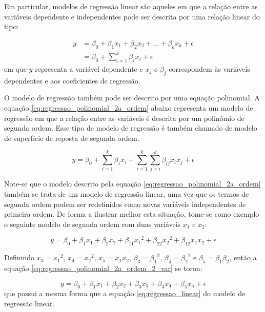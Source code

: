 \documentclass[brazil,tf,epusp]{usp}  %
\begin{document}
Em particular, modelos de regressão linear são aqueles em que a relação entre as variáveis dependente e independentes pode ser descrita por uma relação linear do tipo:

\begin{align}
  y &= \beta_0 + \beta_1 x_1 + \beta_2 x_2 + \dots + \beta_k x_k + \epsilon \nonumber \\
    &= \beta_0 + \sum_{i=1}^k \beta_i x_i + \epsilon
  \label{eq:regressao_linear}
\end{align}
%
em que $y$ representa a variável dependente e $x_j$ e $\beta_j$ correspondem às variáveis dependentes e aos coeficientes de regressão.

O modelo de regressão também pode ser descrito por uma equação polinomial. A equação \ref{eq:regressao_polinomial_2a_ordem} abaixo representa um modelo de regressão em que a relação entre as variáveis é descrita por um polinômio de segunda ordem. Esse tipo de modelo de regressão é também chamado de modelo de superfície de reposta de segunda ordem.

\begin{equation}
  y = \beta_0 + \sum_{i=1}^k \beta_i x_i + \sum_{i=1}^{k} \sum_{j=i}^k \beta_{ij} x_i x_j + \epsilon
  \label{eq:regressao_polinomial_2a_ordem}
\end{equation}

Note-se que o modelo descrito pela equação \ref{eq:regressao_polinomial_2a_ordem} também se trata de um modelo de regressão linear, uma vez que os termos de segunda ordem podem ser redefinidos como novas variáveis independentes de primeira ordem. De forma a ilustrar melhor esta situação, tome-se como exemplo o seguinte modelo de segunda ordem com duas variáveis $x_1$ e $x_2$:

\begin{equation}
  y = \beta_0 + \beta_1 x_1 + \beta_2 x_2 + \beta_{11} {x_1}^2 + \beta_{22} {x_2}^2 + \beta_{12} x_1 x_2 + \epsilon
  \label{eq:regressao_polinomial_2a_ordem_2_var}
\end{equation}

Definindo $x_3 = {x_1}^2$, $x_4 = {x_2}^2$, $x_5 = x_1 x_2$, $\beta_3 = {\beta_1}^2$, $\beta_4 = {\beta_2}^2$ e $\beta_5 = \beta_1 \beta_2$, então a equação \ref{eq:regressao_polinomial_2a_ordem_2_var} se torna:

\begin{equation}
  y = \beta_0 + \beta_1 x_1 + \beta_2 x_2 + \beta_3 x_3 + \beta_4 x_4 + \beta_5 x_5 + \epsilon
\end{equation}
%
que possui a mesma forma que a equação \ref{eq:regressao_linear} do modelo de regressão linear.
\end{document}
